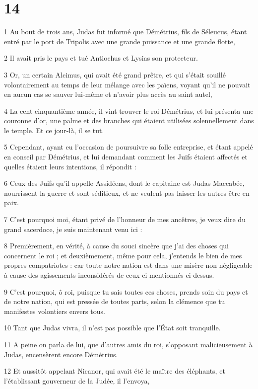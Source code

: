 \chapter{14}

\par 1 Au bout de trois ans, Judas fut informé que Démétrius, fils de Séleucus, étant entré par le port de Tripolis avec une grande puissance et une grande flotte,
\par 2 Il avait pris le pays et tué Antiochus et Lysias son protecteur.
\par 3 Or, un certain Alcimus, qui avait été grand prêtre, et qui s'était souillé volontairement au temps de leur mélange avec les païens, voyant qu'il ne pouvait en aucun cas se sauver lui-même et n'avoir plus accès au saint autel,
\par 4 La cent cinquantième année, il vint trouver le roi Démétrius, et lui présenta une couronne d'or, une palme et des branches qui étaient utilisées solennellement dans le temple. Et ce jour-là, il se tut.
\par 5 Cependant, ayant eu l'occasion de poursuivre sa folle entreprise, et étant appelé en conseil par Démétrius, et lui demandant comment les Juifs étaient affectés et quelles étaient leurs intentions, il répondit :
\par 6 Ceux des Juifs qu'il appelle Assidéens, dont le capitaine est Judas Maccabée, nourrissent la guerre et sont séditieux, et ne veulent pas laisser les autres être en paix.
\par 7 C'est pourquoi moi, étant privé de l'honneur de mes ancêtres, je veux dire du grand sacerdoce, je suis maintenant venu ici :
\par 8 Premièrement, en vérité, à cause du souci sincère que j'ai des choses qui concernent le roi ; et deuxièmement, même pour cela, j'entends le bien de mes propres compatriotes : car toute notre nation est dans une misère non négligeable à cause des agissements inconsidérés de ceux-ci mentionnés ci-dessus.
\par 9 C'est pourquoi, ô roi, puisque tu sais toutes ces choses, prends soin du pays et de notre nation, qui est pressée de toutes parts, selon la clémence que tu manifestes volontiers envers tous.
\par 10 Tant que Judas vivra, il n'est pas possible que l'État soit tranquille.
\par 11 A peine on parla de lui, que d'autres amis du roi, s'opposant malicieusement à Judas, encensèrent encore Démétrius.
\par 12 Et aussitôt appelant Nicanor, qui avait été le maître des éléphants, et l'établissant gouverneur de la Judée, il l'envoya,
